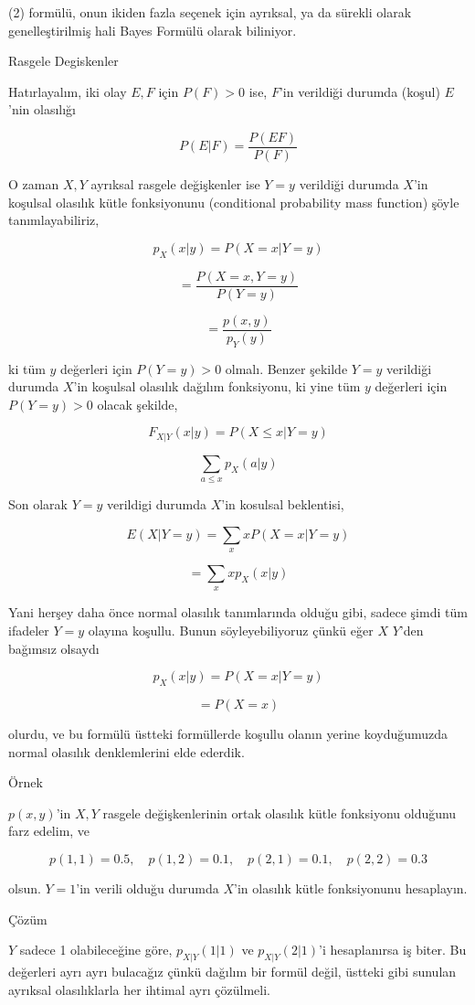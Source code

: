 \documentclass[12pt,fleqn]{article}\usepackage{../../common}
\begin{document}
(2) formülü, onun ikiden fazla seçenek için ayrıksal, ya da sürekli olarak
genelleştirilmiş hali Bayes Formülü olarak biliniyor. 

Rasgele Degiskenler

Hatırlayalım, iki olay $E,F$ için $P(F)>0$ ise, $F$'in verildiği durumda (koşul)
$E$'nin olasılığı

$$ P(E|F) = \frac{P(EF)}{P(F)} $$

O zaman $X,Y$ ayrıksal rasgele değişkenler ise $Y=y$ verildiği durumda $X$'in
koşulsal olasılık kütle fonksiyonunu (conditional probability mass function)
şöyle tanımlayabiliriz,

$$ p_X(x|y) = P(X=x|Y=y) $$

$$ = \frac{P(X=x,Y=y)}{P(Y=y)} $$

$$ = \frac{p(x,y)}{p_Y(y)} $$

ki tüm $y$ değerleri için $P(Y = y) > 0$ olmalı. Benzer şekilde $Y=y$
verildiği durumda $X$'in koşulsal olasılık dağılım fonksiyonu, ki yine tüm $y$
değerleri için $P(Y = y) > 0$ olacak şekilde,

$$ F_{X|Y}(x|y) = P(X \le x | Y=y) $$

$$ \sum_{a \le x} p_X(a|y)$$

Son olarak $Y=y$ verildigi durumda $X$'in kosulsal beklentisi,

$$ E(X|Y=y) = \sum_{x}x P(X=x | Y=y ) $$

$$ = \sum_x x p_X(x|y) $$

Yani herşey daha önce normal olasılık tanımlarında olduğu gibi, sadece şimdi
tüm ifadeler $Y=y$ olayına koşullu. Bunun söyleyebiliyoruz çünkü eğer $X$
$Y$'den bağımsız olsaydı

$$ p_X(x|y) = P(X=x|Y=y)  $$

$$ = P(X=x) $$

olurdu, ve bu formülü üstteki formüllerde koşullu olanın yerine koyduğumuzda
normal olasılık denklemlerini elde ederdik.

Örnek

$p(x,y)$'in $X,Y$ rasgele değişkenlerinin ortak olasılık kütle fonksiyonu
olduğunu farz edelim, ve

$$ p(1,1) = 0.5, \quad
p(1,2) = 0.1, \quad
p(2,1) = 0.1, \quad
p(2,2) = 0.3
$$

olsun. $Y=1$'in verili olduğu durumda $X$'in olasılık kütle fonksiyonunu
hesaplayın.

Çözüm

$Y$ sadece 1 olabileceğine göre, $p_{X|Y}(1|1)$ ve $p_{X|Y}(2|1)$'i hesaplanırsa
iş biter. Bu değerleri ayrı ayrı bulacağız çünkü dağılım bir formül değil,
üstteki gibi sunulan ayrıksal olasılıklarla her ihtimal ayrı çözülmeli.
\end{document}
